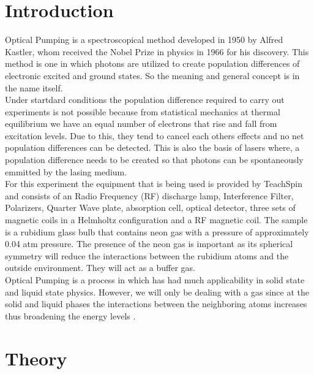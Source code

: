 \documentclass[twocolumn]{article}
\begin{document}
\section{Introduction}
Optical Pumping is a spectroscopical method developed in 1950 by Alfred 
Kastler, whom received the Nobel Prize in physics in 1966 for his discovery. 
This method is one in which photons are utilized to create population 
differences of electronic excited and ground states. So the meaning and general 
concept is in the name itself.
\\
Under startdard conditions the population difference required to carry out 
experiments is not possible because from statistical mechanics at thermal 
equilibrium we have an equal number of electrons that rise and fall from 
excitation levels. Due to this, they tend to cancel each others effects and 
no net population differences can be detected. This is also the basis of lasers 
where, a population difference needs to be created so that photons can be 
spontaneously emmitted by the lasing medium.
\\
For this experiment the equipment that is being used is provided by TeachSpin 
and consists of an Radio Frequency (RF) discharge lamp, Interference Filter, 
Polarizers, Quarter Wave plate, absorption cell, optical detector, three sets 
of magnetic coils in a Helmholtz configuration and a RF magnetic coil. The 
sample is a rubidium glass bulb that contains neon gas with a pressure of 
approximately 0.04 atm pressure. The presence of the neon gas is important as 
its spherical symmetry will reduce the interactions between the rubidium atoms 
and the outside environment. They will act as a buffer gas.
\\
Optical Pumping is a process in which has had much applicability in solid state 
and liquid state physics. However, we will only be dealing with a gas since at 
the solid and liquid phases the interactions between the neighboring atoms 
increases thus broadening the energy levels \cite{ref:1}.

\section{Theory}
\end{document}
